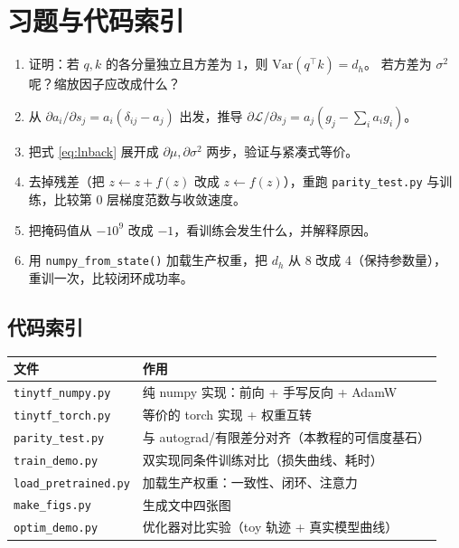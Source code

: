 \chapter{习题与代码索引}
\begin{enumerate}[leftmargin=1.6em,itemsep=6pt]
  \item 证明：若 $q,k$ 的各分量独立且方差为 $1$，则 $\mathrm{Var}(q^\top k)=d_h$。
        若方差为 $\sigma^2$ 呢？缩放因子应改成什么？
  \item 从 $\partial a_i/\partial s_j=a_i(\delta_{ij}-a_j)$ 出发，推导
        $\partial\mathcal{L}/\partial s_j=a_j(g_j-\sum_i a_ig_i)$。
  \item 把式 \eqref{eq:lnback} 展开成 $\partial\mu,\partial\sigma^2$ 两步，验证与紧凑式等价。
  \item 去掉残差（把 $z\leftarrow z+f(z)$ 改成 $z\leftarrow f(z)$），重跑 \texttt{parity\_test.py}
        与训练，比较第 0 层梯度范数与收敛速度。
  \item 把掩码值从 $-10^9$ 改成 $-1$，看训练会发生什么，并解释原因。
  \item 用 \texttt{numpy\_from\_state()} 加载生产权重，把 $d_h$ 从 8 改成 4（保持参数量），
        重训一次，比较闭环成功率。
\end{enumerate}

\section*{代码索引}
\begin{center}
\small
\begin{tabular}{@{}ll@{}}
\toprule
文件 & 作用 \\
\midrule
\texttt{tinytf\_numpy.py} & 纯 numpy 实现：前向 + 手写反向 + AdamW \\
\texttt{tinytf\_torch.py} & 等价的 torch 实现 + 权重互转 \\
\texttt{parity\_test.py} & 与 autograd/有限差分对齐（本教程的可信度基石）\\
\texttt{train\_demo.py} & 双实现同条件训练对比（损失曲线、耗时）\\
\texttt{load\_pretrained.py} & 加载生产权重：一致性、闭环、注意力 \\
\texttt{make\_figs.py} & 生成文中四张图 \\
\texttt{optim\_demo.py} & 优化器对比实验（toy 轨迹 + 真实模型曲线）\\
\bottomrule
\end{tabular}
\end{center}


